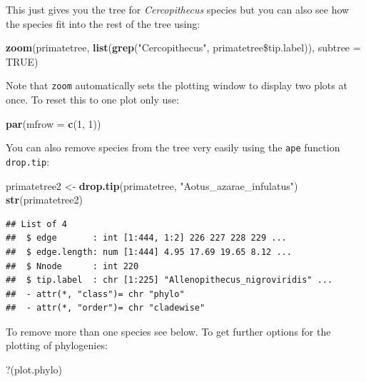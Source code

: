 \documentclass[12pt]{article}
\newcommand{\KeywordTok}[1]{\textcolor[rgb]{0.13,0.29,0.53}{\textbf{{#1}}}}
\newcommand{\DataTypeTok}[1]{\textcolor[rgb]{0.13,0.29,0.53}{{#1}}}
\newcommand{\DecValTok}[1]{\textcolor[rgb]{0.00,0.00,0.81}{{#1}}}
\newcommand{\StringTok}[1]{\textcolor[rgb]{0.31,0.60,0.02}{{#1}}}
\newcommand{\OtherTok}[1]{\textcolor[rgb]{0.56,0.35,0.01}{{#1}}}
\newcommand{\NormalTok}[1]{{#1}}
\begin{document}
This just gives you the tree for \textit{Cercopithecus} species but you can also see how the species fit into the rest of the tree using:

\begin{snugshade}
\begin{Highlighting}[]
\KeywordTok{zoom}\NormalTok{(primatetree, }\KeywordTok{list}\NormalTok{(}\KeywordTok{grep}\NormalTok{(}\StringTok{"Cercopithecus"}\NormalTok{, primatetree\$tip.label)), }
      \DataTypeTok{subtree =} \OtherTok{TRUE}\NormalTok{)}
\end{Highlighting}
\end{snugshade}

Note that \texttt{zoom} automatically sets the plotting window to display two plots at once. To reset this to one plot only use:

\begin{snugshade}
\begin{Highlighting}[]
\KeywordTok{par}\NormalTok{(}\DataTypeTok{mfrow =} \KeywordTok{c}\NormalTok{(}\DecValTok{1}\NormalTok{, }\DecValTok{1}\NormalTok{))}
\end{Highlighting}
\end{snugshade}

You can also remove species from the tree very easily using the \texttt{ape} function \texttt{drop.tip}:

\begin{snugshade}
\begin{Highlighting}[]
\NormalTok{primatetree2 <-}\StringTok{ }\KeywordTok{drop.tip}\NormalTok{(primatetree, }\StringTok{"Aotus_azarae_infulatus"}\NormalTok{)}
\KeywordTok{str}\NormalTok{(primatetree2)}
\end{Highlighting}
\end{snugshade}

\begin{verbatim}
## List of 4
##  $ edge       : int [1:444, 1:2] 226 227 228 229 ...
##  $ edge.length: num [1:444] 4.95 17.69 19.65 8.12 ...
##  $ Nnode      : int 220
##  $ tip.label  : chr [1:225] "Allenopithecus_nigroviridis" ...
##  - attr(*, "class")= chr "phylo"
##  - attr(*, "order")= chr "cladewise"
\end{verbatim}

To remove more than one species see below. To get further options for the plotting of phylogenies:

\begin{snugshade}
\begin{Highlighting}[]
\DataTypeTok{?}\NormalTok{(plot.phylo)}
\end{Highlighting}
\end{snugshade}
\end{document}
